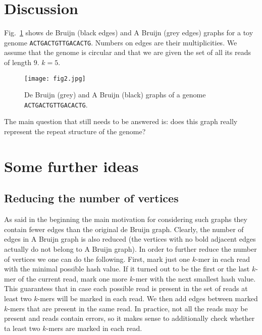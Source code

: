 \documentclass[12pt]{article}
\begin{document}
\section{Discussion}
Fig.~\ref{fig2} shows de Bruijn (black edges) and A Bruijn (grey edges) graphs for a toy genome 
{\tt ACTGACTGTTGACACTG}. Numbers on edges are their multiplicities. We assume that the genome is circular
and that we are given the set of all its reads of length $9$. $k=5$.

\begin{figure}
\caption{De Bruijn (grey) and A Bruijn (black) graphs of a genome {\tt ACTGACTGTTGACACTG}.}\label{fig2}
\begin{center}\texttt{[image: fig2.jpg]}\end{center}
\end{figure}


The main question that still needs to be answered is:
does this graph really represent the repeat structure of the genome?

\section{Some further ideas}
\subsection{Reducing the number of vertices}
As said in the beginning the main motivation for considering such graphs
they contain fewer edges than the original de Bruijn graph. Clearly, the number of edges in
A Bruijn graph is also reduced (the vertices with no bold adjacent edges actually do not belong
to A Bruijn graph). In order to further reduce the number of vertices we one can do the following.
First, mark just one $k$-mer in each read with the minimal possible hash value. If it turned out to be
the first or the last $k$-mer of the current read, mark one more $k$-mer with the next smallest hash 
value. This guarantess that in case each possible read is present in the set of reads
at least two $k$-mers will be marked in each read. We then add edges between marked $k$-mers
that are present in the same read. In practice, not all the reads may be present and 
reads contain errors, so it makes sense to additionally check whether ta least two $k$-mers
are marked in each read.
\end{document}
